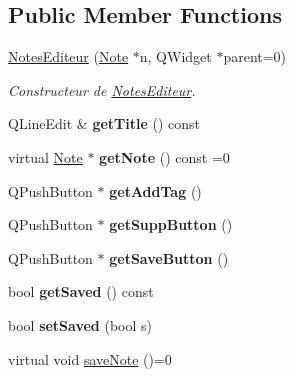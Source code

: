 \subsection*{Public Member Functions}
\begin{DoxyCompactItemize}
\item 
\hyperlink{class_notes_editeur_a82a1e8c5d91db63ddf3bcc279ddc54b2}{Notes\+Editeur} (\hyperlink{class_note}{Note} $\ast$n, Q\+Widget $\ast$parent=0)
\begin{DoxyCompactList}\small\item\em Constructeur de \hyperlink{class_notes_editeur}{Notes\+Editeur}. \end{DoxyCompactList}\item 
\mbox{\label{class_notes_editeur_ae0759f1a8918b0bfe2a0600bcbbbfd80}} 
Q\+Line\+Edit \& {\bfseries get\+Title} () const
\item 
\mbox{\label{class_notes_editeur_a83a6eb91d89ee2fdd620c1efe4b39bc3}} 
virtual \hyperlink{class_note}{Note} $\ast$ {\bfseries get\+Note} () const =0
\item 
\mbox{\label{class_notes_editeur_a1264b641e7fcc1e20e9cf83c968be86a}} 
Q\+Push\+Button $\ast$ {\bfseries get\+Add\+Tag} ()
\item 
\mbox{\label{class_notes_editeur_a3599d133eb683eb51c71b9641971e780}} 
Q\+Push\+Button $\ast$ {\bfseries get\+Supp\+Button} ()
\item 
\mbox{\label{class_notes_editeur_a71522a34eb1dc7a42c5ba3aa2a0c5d13}} 
Q\+Push\+Button $\ast$ {\bfseries get\+Save\+Button} ()
\item 
\mbox{\label{class_notes_editeur_ab993cfdbd1ca33d8271e86f885a5693d}} 
bool {\bfseries get\+Saved} () const
\item 
\mbox{\label{class_notes_editeur_ac16e27061f6a17f8c957dbea0e5fa8ca}} 
bool {\bfseries set\+Saved} (bool s)
\item 
\mbox{\label{class_notes_editeur_a8b2a9f98d90e84252124b212df03b587}} 
virtual void \hyperlink{class_notes_editeur_a8b2a9f98d90e84252124b212df03b587}{save\+Note} ()=0

\end{DoxyCompactItemize}
